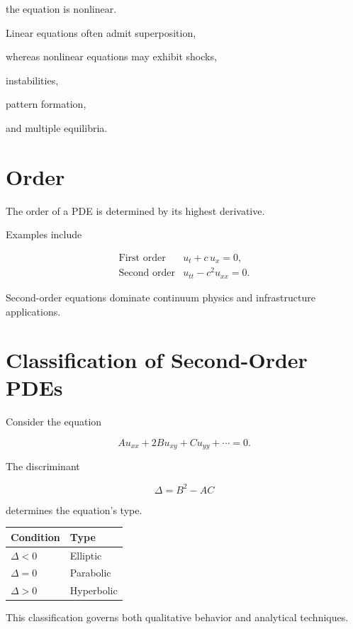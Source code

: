 \documentclass[11pt,fleqn]{book}
\numberwithin{equation}{chapter}
\theoremstyle{plain}
\theoremstyle{definition}
\theoremstyle{remark}
\begin{document}
the equation is nonlinear.

Linear equations often admit superposition,

whereas nonlinear equations may exhibit shocks,

instabilities,

pattern formation,

and multiple equilibria.


\section{Order}

The order of a PDE is determined by its highest derivative.

Examples include

\[
\begin{array}{ll}
\text{First order} &
u_t+c\,u_x=0,
\\[1ex]
\text{Second order} &
u_{tt}-c^2u_{xx}=0.
\end{array}
\]

Second-order equations dominate continuum physics and infrastructure
applications.


\section{Classification of Second-Order PDEs}

Consider the equation

\[
Au_{xx}
+
2Bu_{xy}
+
Cu_{yy}
+\cdots
=0.
\]

The discriminant

\[
\boxed{
\Delta
=
B^2-AC
}
\]

determines the equation's type.

\begin{center}
\begin{tabular}{ll}
\toprule
Condition & Type\\
\midrule
$\Delta<0$ & Elliptic\\
$\Delta=0$ & Parabolic\\
$\Delta>0$ & Hyperbolic\\
\bottomrule
\end{tabular}
\end{center}

This classification governs both qualitative behavior and analytical
techniques.
\end{document}
